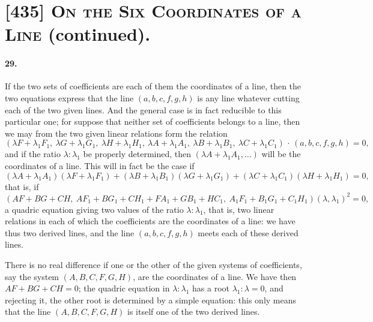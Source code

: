 \documentclass[11pt,a4paper]{article}
\begin{document}
\section{[435] \textsc{On the Six Coordinates of a Line} (continued).}

\setcounter{section}{29}

\paragraph{29.}
If the two sets of coefficients are each of them the coordinates of a line,
then the two equations express that the line $(a,b,c,f,g,h)$ is any line whatever
cutting each of the two given lines. And the general case is in fact reducible to
this particular one; for suppose that neither set of coefficients belongs to a line, then
we may from the two given linear relations form the relation
\[
(\lambda F + \lambda_1 F_1,\ \lambda G + \lambda_1 G_1,\ \lambda H + \lambda_1 H_1,\
  \lambda A + \lambda_1 A_1,\ \lambda B + \lambda_1 B_1,\ \lambda C + \lambda_1 C_1)
  \,\cdot\,(a,b,c,f,g,h) = 0,
\]
and if the ratio $\lambda : \lambda_1$ be properly determined, then $(\lambda A + \lambda_1 A_1,\ldots)$
will be the coordinates of a line. This will in fact be the case if
\[
(\lambda A + \lambda_1 A_1)(\lambda F + \lambda_1 F_1)
+ (\lambda B + \lambda_1 B_1)(\lambda G + \lambda_1 G_1)
+ (\lambda C + \lambda_1 C_1)(\lambda H + \lambda_1 H_1) = 0,
\]
that is, if
\[
(AF + BG + CH,\ AF_1 + BG_1 + CH_1 + FA_1 + GB_1 + HC_1,\
  A_1 F_1 + B_1 G_1 + C_1 H_1)(\lambda, \lambda_1)^2 = 0,
\]
a quadric equation giving two values of the ratio $\lambda : \lambda_1$, that is, two linear
relations in each of which the coefficients are the coordinates of a line: we have thus
two derived lines, and the line $(a,b,c,f,g,h)$ meets each of these derived lines.

There is no real difference if one or the other of the given systems of coefficients,
say the system $(A,B,C,F,G,H)$, are the coordinates of a line. We have then
$AF + BG + CH = 0$; the quadric equation in $\lambda : \lambda_1$ has a root $\lambda_1 : \lambda = 0$,
and rejecting it, the other root is determined by a simple equation: this only means
that the line $(A,B,C,F,G,H)$ is itself one of the two derived lines.
\end{document}
